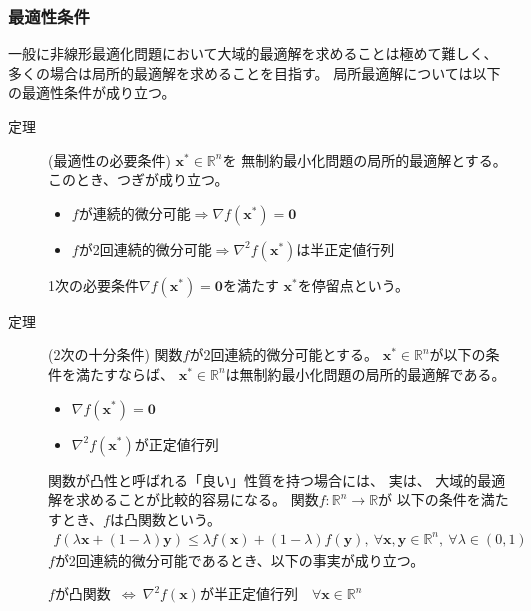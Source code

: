 \documentclass[12pt]{jarticle}
\begin{document}
\clearpage
\subsubsection{最適性条件}

一般に非線形最適化問題において大域的最適解を求めることは極めて難しく、
多くの場合は局所的最適解を求めることを目指す。
局所最適解については以下の最適性条件が成り立つ。
\begin{description}
    \item[定理](最適性の必要条件) $\boldsymbol{x}^*\in \mathbb{R}^n $を
          無制約最小化問題の局所的最適解とする。このとき、つぎが成り立つ。
          \begin{itemize}
              \item $f$が連続的微分可能$\Rightarrow \nabla f(\boldsymbol{x}^*)=\boldsymbol{0}$
              \item $f$が2回連続的微分可能$\Rightarrow \nabla^2 f(\boldsymbol{x}^*)$は半正定値行列
          \end{itemize}
          1次の必要条件$\nabla f(\boldsymbol{x}^*)=\boldsymbol{0}$を満たす
          $\boldsymbol{x}^*$を停留点という。
    \item[定理](2次の十分条件) 関数$f$が2回連続的微分可能とする。
          $\boldsymbol{x}^*\in \mathbb{R}^n$が以下の条件を満たすならば、
          $\boldsymbol{x}^*\in \mathbb{R}^n$は無制約最小化問題の局所的最適解である。
          \begin{itemize}
              \item $\nabla f(\boldsymbol{x}^*)=\boldsymbol{0}$
              \item $\nabla^2f(\boldsymbol{x}^*)$が正定値行列
          \end{itemize}
          関数が凸性と呼ばれる「良い」性質を持つ場合には、
          実は、
          大域的最適解を求めることが比較的容易になる。
          関数$f:\mathbb{R}^n \rightarrow \mathbb{R}$が
          以下の条件を満たすとき、$f$は凸関数という。
          \begin{eqnarray}
              f(\lambda\boldsymbol{x}+(1-\lambda)\boldsymbol{y})\leq \lambda f(\boldsymbol{x})+(1-\lambda)f(\boldsymbol{y}),\ \forall \boldsymbol{x},\boldsymbol{y}\in \mathbb{R}^n,\ \forall \lambda\in(0,1)\nonumber
          \end{eqnarray}
          $f$が2回連続的微分可能であるとき、以下の事実が成り立つ。
          \begin{center}
              $f$が凸関数\ $\Leftrightarrow\ \nabla^2f(\boldsymbol{x})$が半正定値行列\ \ $\forall \boldsymbol{x}\in \mathbb{R}^n$

\end{center}
\end{description}
\end{document}
